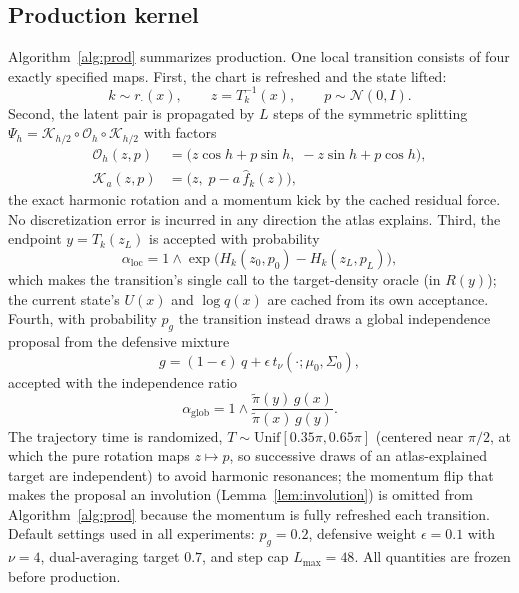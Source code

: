 \documentclass[11pt]{article}
\theoremstyle{remark}
\begin{document}
\subsection{Production kernel}\label{sec:kernel}
Algorithm~\ref{alg:prod} summarizes production. One local transition
consists of four exactly specified maps. First, the chart is refreshed and
the state lifted:
\begin{equation}
k\sim r_\cdot(x),\qquad z=T_k^{-1}(x),\qquad p\sim\mathcal N(0,I).
\end{equation}
Second, the latent pair is propagated by $L$ steps of the symmetric
splitting $\Psi_h=\mathcal K_{h/2}\circ\mathcal O_h\circ\mathcal K_{h/2}$
with factors
\begin{align}
\mathcal O_h(z,p)&=\bigl(z\cos h+p\sin h,\;-z\sin h+p\cos h\bigr),
\label{eq:rot}\\
\mathcal K_a(z,p)&=\bigl(z,\;p-a\,\hat f_k(z)\bigr),
\label{eq:kick}
\end{align}
the exact harmonic rotation and a momentum kick by the cached residual
force. No discretization error is incurred in any direction the atlas
explains. Third, the endpoint $y=T_k(z_L)$ is accepted with probability
\begin{equation}
\alpha_{\mathrm{loc}}
=1\wedge\exp\bigl(H_k(z_0,p_0)-H_k(z_L,p_L)\bigr),
\label{eq:mh}
\end{equation}
which makes the transition's single call to the target-density oracle (in
$R(y)$); the current state's $U(x)$ and $\log q(x)$ are cached from its
own acceptance. Fourth, with probability $p_g$ the transition instead
draws a global independence proposal from the defensive mixture
\begin{equation}
g=(1-\epsilon)\,q+\epsilon\,t_\nu(\cdot;\mu_0,\Sigma_0),
\label{eq:defensive}
\end{equation}
accepted with the independence ratio
\begin{equation}
\alpha_{\mathrm{glob}}
=1\wedge\frac{\tilde\pi(y)\,g(x)}{\tilde\pi(x)\,g(y)}.
\label{eq:imh}
\end{equation}
The trajectory time is randomized, $T\sim\mathrm{Unif}[0.35\pi,0.65\pi]$
(centered near $\pi/2$, at which the pure rotation maps $z\mapsto p$, so
successive draws of an atlas-explained target are independent) to avoid
harmonic resonances; the momentum flip that makes the proposal an
involution (Lemma~\ref{lem:involution}) is omitted from
Algorithm~\ref{alg:prod} because the momentum is fully refreshed each
transition. Default settings used in all experiments: $p_g=0.2$,
defensive weight $\epsilon=0.1$ with $\nu=4$, dual-averaging target
$0.7$, and step cap $L_{\max}=48$. All quantities are frozen before
production.
\end{document}
